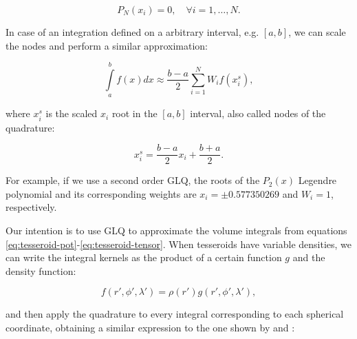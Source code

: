 \documentclass[extra]{gji}
\begin{document}
\begin{equation}
    P_N(x_i) = 0, \quad \forall i = {1,\dots,N}.
\end{equation}

In case of an integration defined on a arbitrary interval, e.g. $[a,b]$, we can scale the nodes and perform a similar approximation:

\begin{equation}
    \int\limits_a^b f(x) dx \approx \frac{b-a}{2} \sum_{i=1}^N W_i f(x_i^s),
\label{eq:glq-scaled}
\end{equation}

\noindent where $x_i^s$ is the scaled $x_i$ root in the $[a,b]$ interval, also called nodes of the quadrature:

\begin{equation}
    x_i^s = \frac{b-a}{2} x_i + \frac{b+a}{2}.
\end{equation}

For example, if we use a second order GLQ, the roots of the $P_2(x)$ Legendre polynomial and its corresponding weights are $x_i = \pm 0.577350269$ and $W_i = 1$, respectively.

Our intention is to use GLQ to approximate the volume integrals from equations \ref{eq:tesseroid-pot}-\ref{eq:tesseroid-tensor}. 
When tesseroids have variable densities, we can write the integral kernels as the product of a certain function $g$ and the density function:

\begin{equation}
    f(r', \phi', \lambda') = \rho(r') g(r', \phi', \lambda'),
\end{equation}

\noindent and then apply the quadrature to every integral corresponding to each spherical coordinate, obtaining a similar expression to the one shown by \citet{Asgharzadeh2007} and \citet{Uieda2016}:

\end{document}
